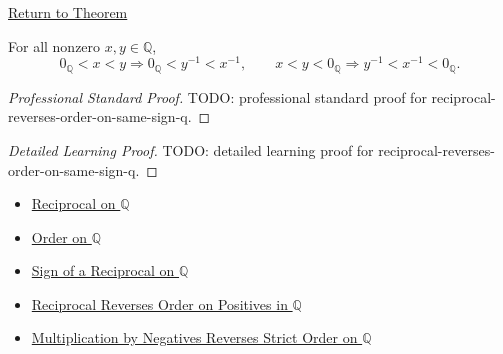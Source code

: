 \newpage
{}
\label{prf:reciprocal-reverses-order-on-same-sign-q}

\begin{remark*}[Return]
\hyperref[thm:reciprocal-reverses-order-on-same-sign-q]{Return to Theorem}
\end{remark*}

\begin{theorem*}
For all nonzero $x,y\in\mathbb{Q}$,
\[
0_{\mathbb{Q}}<x<y
\Longrightarrow
0_{\mathbb{Q}}<y^{-1}<x^{-1},
\qquad
x<y<0_{\mathbb{Q}}
\Longrightarrow
y^{-1}<x^{-1}<0_{\mathbb{Q}}.
\]
\end{theorem*}

\begin{proof}[Professional Standard Proof]
\LRAProofBodyStart
TODO: professional standard proof for reciprocal-reverses-order-on-same-sign-q.
\end{proof}

\begin{proof}[Detailed Learning Proof]
\LRAProofBodyStart
TODO: detailed learning proof for reciprocal-reverses-order-on-same-sign-q.
\end{proof}

\begin{remark*}
\end{remark*}

\begin{dependencies}
\begin{itemize}
  \item \hyperref[def:reciprocal-on-q-classes]{Reciprocal on $\mathbb{Q}$}
  \item \hyperref[def:order-on-q]{Order on $\mathbb{Q}$}
  \item \hyperref[thm:sign-of-reciprocal-q]{Sign of a Reciprocal on $\mathbb{Q}$}
  \item \hyperref[thm:reciprocal-reverses-order-on-positives-q]{Reciprocal Reverses Order on Positives in $\mathbb{Q}$}
  \item \hyperref[thm:negative-multiplication-reverses-strict-order-on-q]{Multiplication by Negatives Reverses Strict Order on $\mathbb{Q}$}
\end{itemize}
\end{dependencies}

\clearpage
